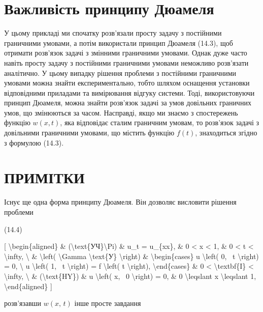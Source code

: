 \documentclass[
]{article}
\begin{document}
\section{Важливість принципу
Дюамеля}\label{ux432ux430ux436ux43bux438ux432ux456ux441ux442ux44c-ux43fux440ux438ux43dux446ux438ux43fux443-ux434ux44eux430ux43cux435ux43bux44f}

У цьому прикладі ми спочатку розв'язали просту задачу з постійними
граничними умовами, а потім використали принцип Дюамеля (14.3), щоб
отримати розв'язок задачі з змінними граничними умовами. Однак дуже
часто навіть просту задачу з постійними граничними умовами неможливо
розв'язати аналітично. У цьому випадку рішення проблеми з постійними
граничними умовами можна знайти експериментально, тобто шляхом оснащення
установки відповідними приладами та вимірювання відгуку системи. Тоді,
використовуючи принцип Дюамеля, можна знайти розв'язок задачі за умов
довільних граничних умов, що змінюються за часом. Насправді, якщо ми
знаємо з спостережень функцію \(w(x, t)\), яка відповідає сталим
граничним умовам, то розв'язок задачі з довільними граничними умовами,
що містить функцію \(f(t)\), знаходиться згідно з формулою (14.3).

\section{ПРИМІТКИ}\label{ux43fux440ux438ux43cux456ux442ux43aux438-3}

Існує ще одна форма принципу Дюамеля. Він дозволяє висловити рішення
проблеми

(14.4)

{[} \textbackslash begin\{aligned\} \&
(\textbackslash text\{УЧ\}\textbackslash Pi) \& u\_t = u\_\{xx\}, \& 0
\textless{} x \textless{} 1, \& 0 \textless{} t \textless{}
\textbackslash infty, \textbackslash{} \& \textbackslash left(
\textbackslash Gamma \textbackslash text\{У\} \textbackslash right) \&
\textbackslash begin\{cases\} u \textbackslash left( 0, ~t
\textbackslash right) = 0, \textbackslash{} u \textbackslash left( 1, ~t
\textbackslash right) = f \textbackslash left( t \textbackslash right),
\textbackslash end\{cases\} \& 0 \textless{} \textbackslash textbf\{I\}
\textless{} \textbackslash infty, \textbackslash{} \&
(\textbackslash text\{HY\}) \& u \textbackslash left( x, ~0
\textbackslash right) = 0, \& 0 \textbackslash leqslant x
\textbackslash leqslant 1, \textbackslash end\{aligned\} {]}

розв'язавши \(w\left(x,\,t\right)\) інше просте завдання
\end{document}
